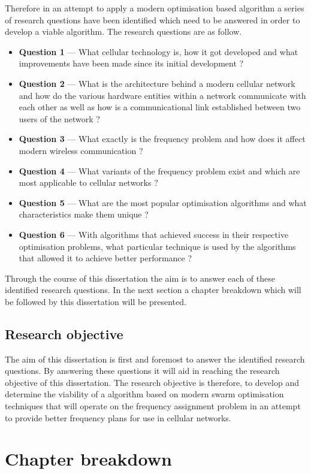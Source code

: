 Therefore in an attempt to apply a modern optimisation based algorithm a series of research questions have been identified which need to be answered in order to develop a viable algorithm. The research questions are as follow.
\begin{itemize}
\item \textbf{Question 1} --- What cellular technology is, how it got developed and what improvements have been made since its initial development ?
\item \textbf{Question 2} --- What is the architecture behind a modern cellular network and how do the various hardware entities within a network communicate with each other as well as how is a communicational link established between two users of the network ?
\item \textbf{Question 3} --- What exactly is the frequency problem and how does it affect modern wireless communication ?
\item \textbf{Question 4} --- What variants of the frequency problem exist and which are most applicable to cellular networks ?
\item \textbf{Question 5} --- What are the most popular optimisation algorithms and what characteristics make them unique ?
\item \textbf{Question 6} --- With algorithms that achieved success in their respective optimisation problems, what particular technique is used by the algorithms that allowed it to achieve better performance ?
\end{itemize}

Through the course of this dissertation the aim is to answer each of these identified research questions. In the next section a chapter breakdown which will be followed by this dissertation will be presented.

\subsection{Research objective}
The aim of this dissertation is first and foremost to answer the identified research questions. By answering these questions it will aid in reaching the research objective of this dissertation. The research objective is therefore, to develop and determine the viability of a algorithm based on modern swarm optimisation techniques that will operate on the frequency assignment problem in an attempt to provide better frequency plans for use in cellular networks.
\section {Chapter breakdown}
